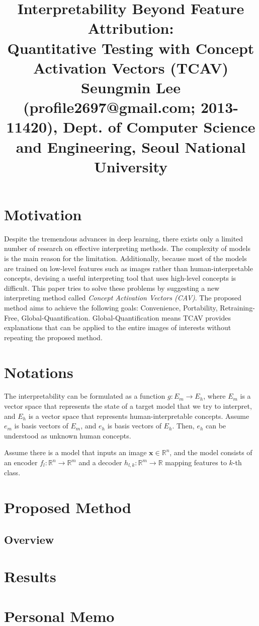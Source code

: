\documentclass[10pt,twocolumn,letterpaper]{article}
\begin{document}
\title{Interpretability Beyond Feature Attribution: \\Quantitative Testing with Concept Activation Vectors (TCAV)
	 \\ {\rm {\normalsize Seungmin Lee (profile2697@gmail.com; 2013-11420), Dept. of Computer Science and Engineering, Seoul National University}}} 

\maketitle
\thispagestyle{empty}


\section{Motivation}
Despite the tremendous advances in deep learning, there exists only a limited number of research on effective interpreting methods. The complexity of models is the main reason for the limitation. Additionally, because most of the models are trained on low-level features such as images rather than human-interpretable concepts, devising a useful interpreting tool that uses high-level concepts is difficult. This paper tries to solve these problems by suggesting a new interpreting method called \textit{Concept Activation Vectors (CAV)}. The proposed method aims to achieve the following goals: Convenience, Portability, Retraining-Free, Global-Quantification. Global-Quantification means TCAV provides explanations that can be applied to the entire images of interests without repeating the proposed method.

\section{Notations}
The interpretability can be formulated as a function $g: E_m \rightarrow E_h$, where $E_m$ is a vector space that represents the state of a target model that we try to interpret, and $E_h$ is a vector space that represents human-interpretable concepts. Assume $e_m$ is basis vectors of $E_m$, and $e_h$ is basis vectors of $E_h$. Then, $e_h$ can be understood as unknown human concepts. 

Assume there is a model that inputs an image $\mathbf{x} \in \mathbb{R}^n$, and the model consists of an encoder $f_l: \mathbb{R}^n \rightarrow \mathbb{R}^m$ and a decoder $h_{l, k}: \mathbb{R}^m \rightarrow \mathbb{R}$ mapping features to $k$-th class.

\section{Proposed Method}
\subsection{Overview}

\section{Results}


\section{Personal Memo}


{\small

% 
}
\end{document}
